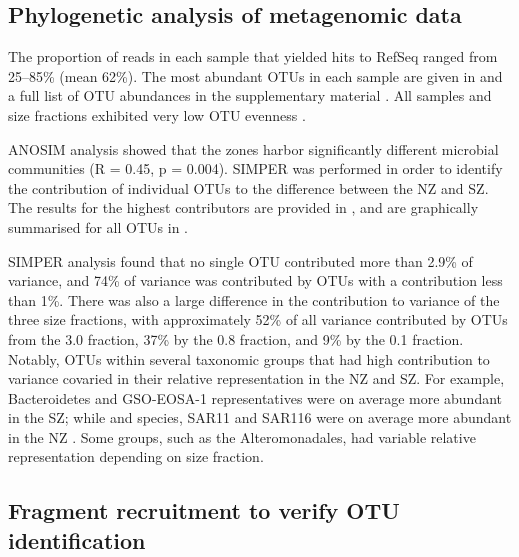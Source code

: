 \subsection{Phylogenetic analysis of metagenomic data}

The proportion of reads in each sample that yielded hits to RefSeq ranged from 25--85\% (mean 62\%).
The most abundant \acp{OTU} in each sample are given in  and a full list of \ac{OTU} abundances in the supplementary material .
All samples and size fractions exhibited very low \ac{OTU} evenness .




\ac{ANOSIM} analysis showed that the zones harbor significantly different microbial communities (R = 0.45, p = 0.004). 
\ac{SIMPER} was performed in order to identify the contribution of individual \acp{OTU} to the difference between the \ac{NZ} and \ac{SZ}. 
The results for the highest contributors are provided in , and are graphically summarised for all \acp{OTU} in .




\ac{SIMPER} analysis found that no single \ac{OTU} contributed more than 2.9\% of variance, and 74\% of variance was contributed by \acp{OTU} with a contribution less than 1\%.
There was also a large difference in the contribution to variance of the three size fractions, with approximately 52\% of all variance contributed by \acp{OTU} from the 3.0 \micron{} fraction, 37\% by the 0.8 \micron{} fraction, and 9\% by the 0.1 \micron{} fraction.
Notably, \acp{OTU} within several taxonomic groups that had high contribution to variance covaried in their relative representation in the \ac{NZ} and \ac{SZ}.
For example, Bacteroidetes and GSO-EOSA-1 representatives were on average more abundant in the \ac{SZ}; while  and  species, SAR11 and SAR116 were on average more abundant in the \ac{NZ} .
Some groups, such as the Alteromonadales, had variable relative representation depending on size fraction.

\subsection{Fragment recruitment to verify \ac{OTU} identification}

